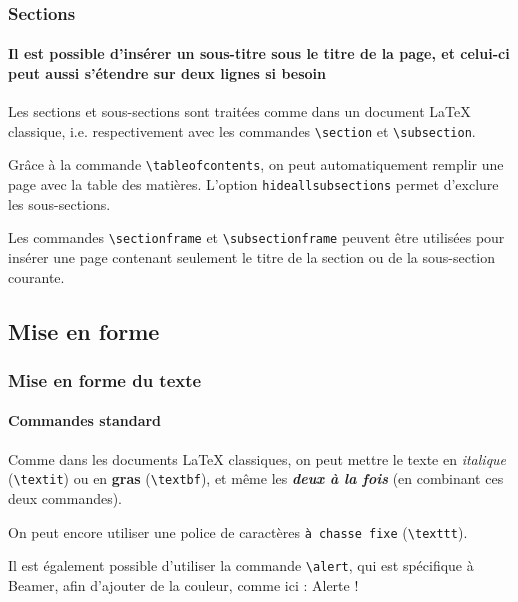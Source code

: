\documentclass[10pt,    %
    french,             %
    xcolor=table,       %
    envcountsect,       %
    aspectratio=43      %
]{beamer}
\begin{document}
\begin{frame}
    \frametitle{Sections} 
    \framesubtitle{Il est possible d'insérer un sous-titre sous le titre de la page, et celui-ci peut aussi s'étendre sur deux lignes si besoin}
    
    Les sections et sous-sections sont traitées comme dans un document \LaTeX{} classique, i.e. respectivement avec les commandes \texttt{\textbackslash{}section} et \texttt{\textbackslash{}subsection}.
    
    \medskip
    Grâce à la commande \texttt{\textbackslash{}tableofcontents}, on peut automatiquement remplir une page avec la table des matières. L'option \texttt{hideallsubsections} permet d'exclure les sous-sections.
    
    \medskip
    Les commandes \texttt{\textbackslash{}sectionframe} et \texttt{\textbackslash{}subsectionframe} peuvent être utilisées pour insérer une page contenant seulement le titre de la section ou de la sous-section courante.
\end{frame}




\subsection{Mise en forme}
\begin{frame}
    \frametitle{Mise en forme du texte}
    \framesubtitle{Commandes standard}
    
    Comme dans les documents \LaTeX{} classiques, on peut mettre le texte en \textit{italique} (\texttt{\textbackslash{}textit}) ou en \textbf{gras} (\texttt{\textbackslash{}textbf}), et même les \textit{\textbf{deux à la fois}} (en combinant ces deux commandes). 
    
    \medskip
    On peut encore utiliser une police de caractères \texttt{à chasse fixe} (\texttt{\textbackslash{}texttt}).
    
    \medskip
    Il est également possible d'utiliser la commande \texttt{\textbackslash{}alert}, qui est spécifique à Beamer, afin d'ajouter de la couleur, comme ici : \alert{Alerte !}
    

\end{frame}
    
\end{document}
